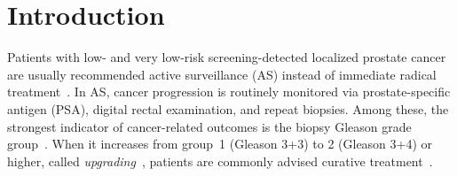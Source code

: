 
\section{Introduction}
Patients with low- and very low-risk screening-detected localized prostate cancer are usually recommended active surveillance (AS) instead of immediate radical treatment~\citep{briganti2018active}. In AS, cancer progression is routinely monitored via prostate-specific antigen (PSA), digital rectal examination, and repeat biopsies. Among these, the strongest indicator of cancer-related outcomes is the biopsy Gleason grade group~\citep{epsteinGG2014}. When it increases from group~1 (Gleason 3+3) to 2 (Gleason 3+4) or higher, called \textit{upgrading}~\citep{bruinsma2017expert}, patients are commonly advised curative treatment~\citep{bul2013active}.

